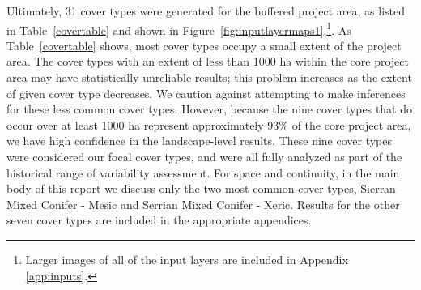 Ultimately, 31 cover types were generated for the buffered project area, as listed in Table~\ref{covertable} and shown in Figure~\ref{fig:inputlayermaps1}.\footnote{Larger images of all of the input layers are included in Appendix \ref{app:inputs}.}. %
As Table~\ref{covertable} shows, most cover types occupy a small extent of the project area. The cover types with an extent of less than 1000 ha within the core project area may have statistically unreliable results; this problem increases as the extent of given cover type decreases. We caution against attempting to make inferences for these less common cover types. However, because the nine cover types that do occur over at least 1000 ha represent approximately 93\% of the core project area, we have high confidence in the landscape-level results. These nine cover types were considered our focal cover types, and were all fully analyzed as part of the historical range of variability assessment. For space and continuity, in the main body of this report we discuss only the two most common cover types, Sierran Mixed Conifer - Mesic and Serrian Mixed Conifer - Xeric. Results for the other seven cover types are included in the appropriate appendices. 

